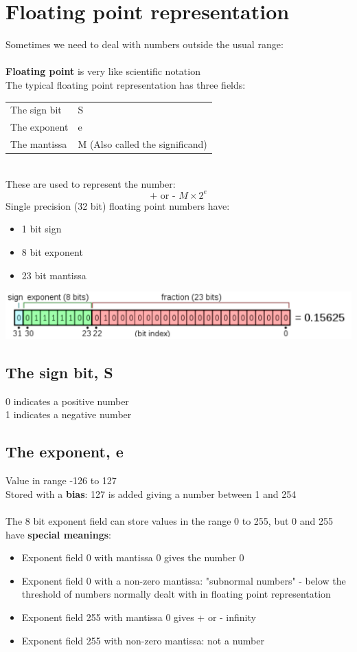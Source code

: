 \documentclass{article}[18pt]
\begin{document}
\section{Floating point representation}
Sometimes we need to deal with numbers outside the usual range:\\
\\
\textbf{Floating point} is very like scientific notation\\
The typical floating point representation has three fields:\\
\begin{tabular}{l l}
The sign bit& S\\
The exponent& e\\
The mantissa& M (Also called the significand)
\end{tabular}\\
These are used to represent the number:
$$\textrm{+ or - } M \times2^e$$
Single precision (32 bit) floating point numbers have:
\begin{itemize}
\item 1 bit sign
\item 8 bit exponent
\item 23 bit mantissa
\end{itemize}
\includegraphics[width=\textwidth]{float.png}
\subsection{The sign bit, S}
0 indicates a positive number\\
1 indicates a negative number
\subsection{The exponent, e}
Value in range -126 to 127\\
Stored with a \textbf{bias}: 127 is added giving a number between 1 and 254\\
\\
The 8 bit exponent field can store values in the range 0 to 255, but 0 and 255 have \textbf{special meanings}:
\begin{itemize}
\item Exponent field 0 with mantissa 0 gives the number 0
\item Exponent field 0 with a non-zero mantissa: "subnormal numbers" - below the threshold of numbers normally dealt with in floating point representation
\item Exponent field 255 with mantissa 0 gives + or - infinity
\item Exponent field 255 with non-zero mantissa: not a number
\end{itemize}
\end{document}
